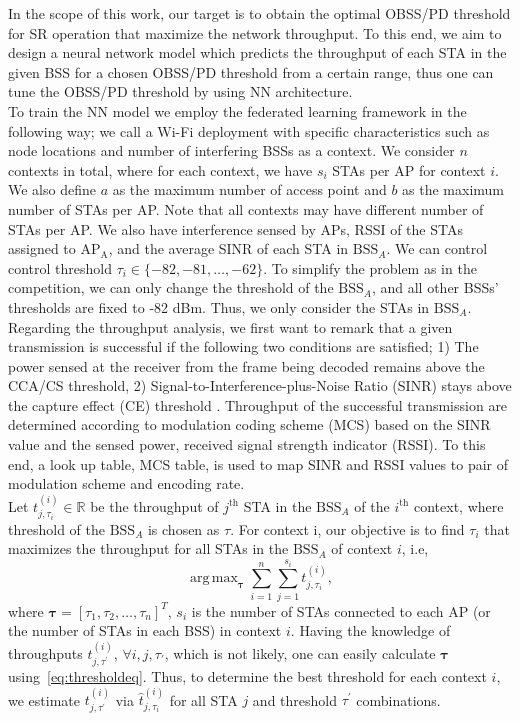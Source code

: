 \documentclass[journal]{IEEEtran}
\DeclareMathOperator*{\argmax}{arg\,max}
\renewcommand{\vec}[1]{\boldsymbol{#1}}
\begin{document}
In the scope of this work, our target is to obtain the optimal OBSS/PD threshold for SR operation that maximize the network throughput. To this end, we aim to design a neural network model which predicts the throughput of each STA in the given BSS for a chosen OBSS/PD threshold from a certain range, thus one can tune the OBSS/PD threshold by using NN architecture.\\
\indent To train the NN model we employ the federated learning framework in the following way; we call a Wi-Fi deployment with specific characteristics such as node locations and number of interfering BSSs as a context. We consider $n$ contexts in total, where for each context, we have $s_i$ STAs per AP for context $i$. We also define $a$ as the maximum number of access point and $b$ as the maximum number of STAs per AP. Note that all contexts may have different number of STAs per AP. We also have interference sensed by APs, RSSI of the STAs assigned to $\mathrm{AP}_\mathrm{A}$, and the average SINR of each STA in $\mathrm{BSS}_A$. We can control control threshold $\tau_i \in \{-82, -81, \ldots, -62\}$. To simplify the problem as in the competition, we can only change the threshold of the $\mathrm{BSS}_A$, and all other BSSs' thresholds are fixed to -82 dBm. Thus, we only consider the STAs in $\mathrm{BSS}_A$.\\
\indent  Regarding the throughput analysis, we first want to remark that a given transmission is successful if the  following two conditions are satisfied; 1) The power sensed at the receiver from the frame being decoded remains above the CCA/CS threshold, 2) Signal-to-Interference-plus-Noise Ratio (SINR)
stays above the capture effect (CE) threshold \cite{wilhelmi2019performance}. Throughput of the successful transmission are determined according to modulation coding scheme (MCS) based on the SINR value and the sensed power, received signal strength indicator (RSSI).  To this end, a look up table, MCS table, is used to map SINR and RSSI values to pair of modulation scheme and encoding rate.\\
\indent Let $t_{j, \tau_{i}}^{(i)} \in \mathbb{R}$ be the throughput of $j^\mathrm{th}$ STA in the $\mathrm{BSS}_A$ of the $i^\mathrm{th}$ context, where threshold of the $\mathrm{BSS}_A$ is chosen as $\tau$. For context i, our objective is to find $\tau_i$ that maximizes the throughput for all STAs in the $\mathrm{BSS}_A$ of context $i$, i.e,
\begin{equation}
    \argmax_{\vec{\tau}} \sum_{i=1}^{n} \sum_{j=1}^{s_i} t_{j, \tau_{i}}^{(i)},
    \label{eq:thresholdeq}
\end{equation}
where $\vec{\tau} = \left[\tau_1, \tau_2, \ldots, \tau_n \right]^T$, $s_i$ is the number of STAs connected to each AP (or the number of STAs in each BSS) in context $i$. Having the knowledge of throughputs $t_{j, \tau^{'}}^{(i)}$, $\forall i,j,\tau_{'}$, which is not likely, one can easily calculate $\vec{\tau}$ using~\eqref{eq:thresholdeq}. Thus, to determine the best threshold for each context $i$, we  estimate $t_{j, \tau^{'}}^{(i)}$ via $\hat{t}_{j, \tau_{i}}^{(i)}$ for all STA $j$ and threshold $\tau^{'}$ combinations.
\end{document}
